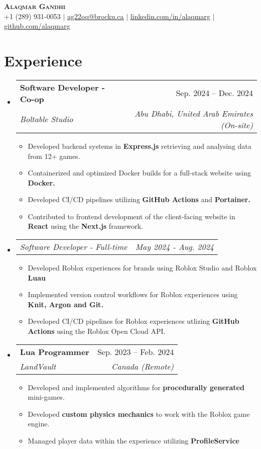 \documentclass[letterpaper,11pt]{article}
\makeatletter
\newcommand{\resumeItem}[1]{
  \item\small{
    {#1 \vspace{-2pt}}
  }
}
\newcommand{\resumeSubheading}[4]{
  \vspace{-2pt}\item
    \begin{tabular*}{0.97\textwidth}[t]{l@{\extracolsep{\fill}}r}
      \textbf{#1} & #2 \\
      \textit{\small#3} & \textit{\small #4} \\
    \end{tabular*}\vspace{-7pt}
}
\newcommand{\resumeSubSubheading}[2]{
    \item
    \begin{tabular*}{0.97\textwidth}{l@{\extracolsep{\fill}}r}
      \textit{\small#1} & \textit{\small #2} \\
    \end{tabular*}\vspace{-7pt}
}
\newcommand{\resumeSubHeadingListStart}{\begin{itemize}[leftmargin=0.15in, label={}]}
\newcommand{\resumeSubHeadingListEnd}{\end{itemize}}
\newcommand{\resumeItemListStart}{\begin{itemize}}
\newcommand{\resumeItemListEnd}{\end{itemize}\vspace{-5pt}}
\makeatother
\begin{document}
\begin{center}
    \textbf{\Huge \scshape Alaqmar Gandhi} \\ \vspace{1pt}
    \small +1 (289) 931-0053 $|$ \href{mailto:ag22oq@brocku.ca}{\underline{ag22oq@brocku.ca}} $|$ 
    \href{https://linkedin.com/in/alaqmarg}{\underline{linkedin.com/in/alaqmarg}} $|$
    \href{https://github.com/alaqmarg}{\underline{github.com/alaqmarg}}
\end{center}

\section{Experience}
  \resumeSubHeadingListStart

    \resumeSubheading
      {Software Developer - Co-op}{Sep. 2024 -- Dec. 2024}
      {Boltable Studio}{Abu Dhabi, United Arab Emirates (On-site)}
      \resumeItemListStart
        \resumeItem{Developed backend systems in \textbf{Express.js} retrieving and analysing data from 12+ games. }
        \resumeItem{Containerized and optimized Docker builds for a full-stack website using \textbf{Docker.}}
        \resumeItem{Developed CI/CD pipelines utilizing \textbf{GitHub Actions} and \textbf{Portainer.}}
        \resumeItem{Contributed to frontend development of the client-facing website in \textbf{React} using the \textbf{Next.js} framework.}
      \resumeItemListEnd

    \resumeSubSubheading
    {Software Developer - Full-time}{May 2024 - Aug. 2024}
      \resumeItemListStart
        \resumeItem{Developed Roblox experiences for brands using Roblox Studio and Roblox \textbf{Luau}}
        \resumeItem{Implemented version control workflows for Roblox experiences using \textbf{Knit, Argon and Git.}}
        \resumeItem{Developed CI/CD pipelines for Roblox experiences utlizing \textbf{GitHub Actions} using the Roblox Open Cloud API.}
      \resumeItemListEnd

    \resumeSubheading
      {Lua Programmer}{Sep. 2023 -- Feb. 2024}
      {LandVault}{Canada (Remote)}
      \resumeItemListStart
        \resumeItem{Developed and implemented algorithms for \textbf{procedurally generated} mini-games.}
        \resumeItem{Developed \textbf{custom physics mechanics} to work with the Roblox game engine.}
        \resumeItem{Managed player data within the experience utilizing \textbf{ProfileService}}
      \resumeItemListEnd
  \resumeSubHeadingListEnd
\end{document}
